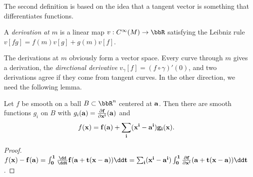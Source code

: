 The second definition is based on the idea that a tangent vector is something that differentiates functions.

\begin{defn}
    A \emph{derivation at $m$} is a linear map $v:C^\infty(M)\to\bbR$ satisfying the Leibniz rule $v[fg]=f(m)v[g]+g(m)v[f]$.
\end{defn}
The derivations at $m$ obviously form a vector space. Every curve through $m$ gives a derivation, the \emph{directional derivative} $v_\gamma[f]=(f\circ\gamma)'(0)$, and two derivations agree if they come from tangent curves. In the other direction, we need the following lemma.

\begin{lem}[Hadamard]\label{lem Hadamard}
    Let $f$ be smooth on a ball $B\subset\bbR^n$ centered at $\bf{a}$. Then there are smooth functions $g_i$ on $B$ with $g_i(\bf{a})=\frac{\partial f}{\partial x^i}(\bf{a})$ and
    \[f(\bf{x})=f(\bf{a})+\sum_i(x^i-a^i)g_i(\bf{x}).\]
\end{lem}
\begin{proof}
    $f(\bf{x})-f(\bf{a})=\int_0^1\frac{\dd}{\dd t}f(\bf{a}+t(\bf{x}-\bf{a}))\dd t=\sum_i(x^i-a^i)\int_0^1\frac{\partial f}{\partial x^i}(\bf{a}+t(\bf{x}-\bf{a}))\dd t$.
\end{proof}

